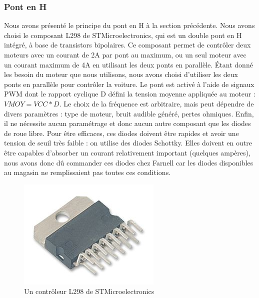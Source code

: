 \documentclass[a4paper,12pt]{report}
\begin{document}
			\subsubsection{Pont en H}
			Nous avons présenté le principe du pont en H à la section précédente.  Nous avons choisi le composant L298 de STMicroelectronics, qui est un double pont en H intégré, à base de transistors bipolaires.
Ce composant permet de contrôler deux moteurs avec un courant de 2A par pont au maximum, ou un seul moteur avec un courant maximum de 4A en utilisant les deux ponts en parallèle. Étant donné les besoin du moteur que nous utilisons, nous avons choisi d’utiliser les deux ponts en parallèle pour contrôler la voiture.
Le pont est activé à l’aide de signaux PWM dont le rapport cyclique D défini la tension moyenne appliquée au moteur : $VMOY = VCC * D$. Le choix de la fréquence est arbitraire, mais peut dépendre de divers paramètres : type de moteur, bruit audible généré, pertes ohmiques.
Enfin, il ne nécessite aucun paramétrage et donc aucun autre composant que les diodes de roue libre. Pour être efficaces, ces diodes doivent être rapides et avoir une tension de seuil très faible : on utilise des diodes Schottky. Elles doivent en outre être capables d’absorber un courant relativement important (quelques ampères), nous avons donc dû commander ces diodes chez Farnell car les diodes disponibles au magasin ne remplissaient pas toutes ces conditions.

\begin{figure}[!h]
	\begin{center}
		\includegraphics[scale=0.3]{images/L298.jpg}
	\end{center}
	\caption{Un contrôleur L298 de STMicroelectronics} 
	\label{L298}
\end{figure}

			
\end{document}
